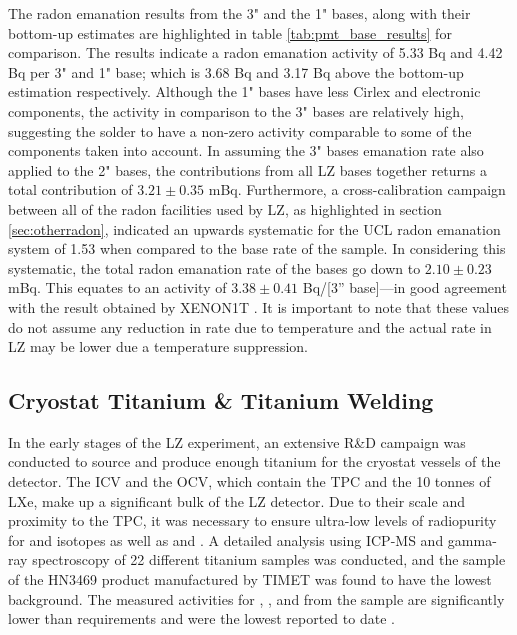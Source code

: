 %

%
The radon emanation results from the 3" and the 1" bases, along with their bottom-up estimates are highlighted in table \ref{tab:pmt_base_results} for comparison. The results indicate a radon emanation activity of 5.33 \micro{}Bq and 4.42 \micro{}Bq per 3" and 1" base; which is 3.68 \micro{}Bq and 3.17 \micro{}Bq above the bottom-up estimation respectively. Although the 1" bases have less Cirlex and electronic components, the activity in comparison to the 3" bases are relatively high, suggesting the solder to have a non-zero activity comparable to some of the components taken into account. In assuming the 3" bases emanation rate also applied to the 2" bases, the contributions from all LZ bases together returns a total contribution of $3.21 \pm 0.35$ mBq.  Furthermore, a cross-calibration campaign between all of the radon facilities used by LZ, as highlighted in section \ref{sec:otherradon}, indicated an upwards systematic for the UCL radon emanation system of 1.53 when compared to the base rate of the sample. In considering this systematic, the total radon emanation rate of the bases go down to $2.10\pm0.23$ mBq. This equates to an activity of $3.38\pm0.41$ \micro{}Bq/[3” base]---in good agreement with the result obtained by XENON1T \cite{Natascha}. It is important to note that these values do not assume any reduction in rate due to temperature and the actual rate in LZ may be lower due a temperature suppression.


\subsection{Cryostat Titanium \& Titanium Welding}
\label{secsec:titanium_emanation}

In the early stages of the LZ experiment, an extensive R\&D campaign was conducted to source and produce enough titanium for the cryostat vessels of the detector. The ICV and the OCV, which contain the TPC and the 10 tonnes of LXe, make up a significant bulk of the LZ detector. Due to their scale and proximity to the TPC, it was necessary to ensure ultra-low levels of radiopurity for \UTTE{} and \ThTTT{} isotopes as well as \KFZ{} and \CoSZ{}. A detailed analysis using ICP-MS and gamma-ray spectroscopy of 22 different titanium samples was conducted, and the sample of the HN3469 product manufactured by TIMET was found to have the lowest background. The measured activities for \UTTEe{}, \ThTTTe{}, \CoSZ{} and \KFZ{} from the sample are significantly lower than requirements and were the lowest reported to date \cite{LZ_titanium_selection}. 


